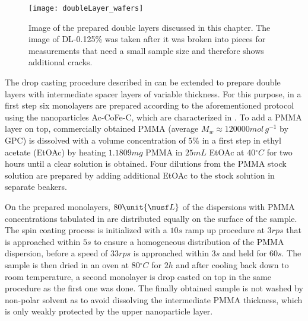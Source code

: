 \documentclass[\main/dresen_thesis.tex]{subfiles}
\begin{document}
  \begin{figure}[tb]
    \centering
    \texttt{[image: doubleLayer\_wafers]}
    \caption{\label{fig:doubleLayers:preparation:waferImage}Image of the prepared double layers discussed in this chapter. The image of DL-0.125\% was taken after it was broken into pieces for measurements that need a small sample size and therefore shows additional cracks.}
  \end{figure}

  The drop casting procedure described in  can be extended to prepare double layers with intermediate spacer layers of variable thickness.
  For this purpose, in a first step six monolayers are prepared according to the aforementioned protocol using the nanoparticles Ac-CoFe-C, which are characterized in .
  To add a PMMA layer on top, commercially obtained PMMA (average $M_w \approx 120000 \unit{mol \, g^{-1}}$ by GPC) is dissolved with a volume concentration of $5 \%$ in a first step in ethyl acetate (EtOAc) by heating $1.1809 \unit{mg}$ PMMA in $25 \unit{mL}$ EtOAc at $40 \unit{^\circ C}$ for two hours until a clear solution is obtained.
  Four dilutions from the PMMA stock solution are prepared by adding additional EtOAc to the stock solution in separate beakers.

  On the prepared monolayers, $80 \unit{\musf L}$ of the dispersions with PMMA concentrations tabulated in  are distributed equally on the surface of the sample.
  The spin coating process is initialized with a $10 \unit{s}$ ramp up procedure at $3 \unit{rps}$ that is approached within $5s$ to ensure a homogeneous distribution of the PMMA dispersion, before a speed of $33 \unit{rps}$ is approached within $3 \unit{s}$ and held for $60 \unit{s}$.
  The sample is then dried in an oven at $80 \unit{^\circ C}$ for $2 \unit{h}$ and after cooling back down to room temperature, a second monolayer is drop casted on top in the same procedure as the first one was done.
  The finally obtained sample is not washed by non-polar solvent as to avoid dissolving the intermediate PMMA thickness, which is only weakly protected by the upper nanoparticle layer.
\end{document}
